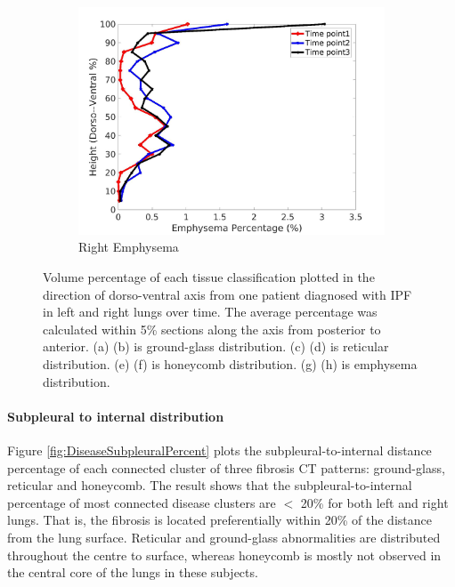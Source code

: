 \begin{figure}[H]
\begin{subfigure}{.42\linewidth}
  \includegraphics[width=\linewidth,trim={{.0\wd0} {.0\wd0} {.0\wd0} {.0\wd0}},clip]{QuantitativeAnalysis/Image/IPF21RightLungEmphysemaDiseaseDorsoToVentral.jpg}
  \caption{Right Emphysema}
  \label{fig:IPF21DiseaseDorsoToVentralMain-h}
\end{subfigure}
\caption{Volume percentage of each tissue classification plotted in the direction of dorso-ventral axis from one patient diagnosed with IPF in left and right lungs over time. The average percentage was calculated within 5\% sections along the axis from posterior to anterior. (a) (b) is ground-glass distribution. (c) (d) is reticular distribution. (e) (f) is honeycomb distribution. (g) (h) is emphysema distribution.}
\label{fig:IPF21DiseaseDorsoToVentralMain}
\end{figure}

\paragraph{Subpleural to internal distribution}
Figure \ref{fig:DiseaseSubpleuralPercent} plots the subpleural-to-internal distance percentage of each connected cluster of three fibrosis CT patterns: ground-glass, reticular and honeycomb. The result shows that the subpleural-to-internal percentage of most connected disease clusters are $<$ 20\% for both left and right lungs. That is, the fibrosis is located preferentially within 20\% of the distance from the lung surface. Reticular and ground-glass abnormalities are distributed throughout the centre to surface, whereas honeycomb is mostly not observed in the central core of the lungs in these subjects.

